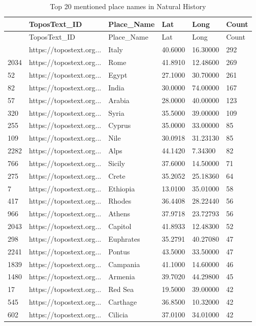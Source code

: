 \documentclass[
  12pt,
]{article}
\begin{document}
\hypertarget{tbl-topplace}{}
\begin{longtable}[]{@{}llllll@{}}
\caption{\label{tbl-topplace}Top 20 mentioned place names in Natural
History}\tabularnewline
\toprule\noalign{}
& ToposText\_ID & Place\_Name & Lat & Long & Count \\
\midrule\noalign{}
\endfirsthead
\toprule\noalign{}
& ToposText\_ID & Place\_Name & Lat & Long & Count \\
\midrule\noalign{}
\endhead
\bottomrule\noalign{}
\endlastfoot
1687 & https://topostext.org... & Italy & 40.6000 & 16.30000 & 292 \\
2034 & https://topostext.org... & Rome & 41.8910 & 12.48600 & 269 \\
52 & https://topostext.org... & Egypt & 27.1000 & 30.70000 & 261 \\
82 & https://topostext.org... & India & 30.0000 & 74.00000 & 167 \\
57 & https://topostext.org... & Arabia & 28.0000 & 40.00000 & 123 \\
320 & https://topostext.org... & Syria & 35.5000 & 39.00000 & 109 \\
255 & https://topostext.org... & Cyprus & 35.0000 & 33.00000 & 85 \\
109 & https://topostext.org... & Nile & 30.0918 & 31.23130 & 85 \\
2282 & https://topostext.org... & Alps & 44.1420 & 7.34300 & 82 \\
766 & https://topostext.org... & Sicily & 37.6000 & 14.50000 & 71 \\
275 & https://topostext.org... & Crete & 35.2052 & 25.18360 & 64 \\
7 & https://topostext.org... & Ethiopia & 13.0100 & 35.01000 & 58 \\
417 & https://topostext.org... & Rhodes & 36.4408 & 28.22440 & 56 \\
966 & https://topostext.org... & Athens & 37.9718 & 23.72793 & 56 \\
2043 & https://topostext.org... & Capitol & 41.8933 & 12.48300 & 52 \\
298 & https://topostext.org... & Euphrates & 35.2791 & 40.27080 & 47 \\
2241 & https://topostext.org... & Pontus & 43.5000 & 33.50000 & 47 \\
1839 & https://topostext.org... & Campania & 41.1000 & 14.60000 & 46 \\
1480 & https://topostext.org... & Armenia & 39.7020 & 44.29800 & 45 \\
17 & https://topostext.org... & Red Sea & 19.5000 & 39.00000 & 42 \\
545 & https://topostext.org... & Carthage & 36.8500 & 10.32000 & 42 \\
602 & https://topostext.org... & Cilicia & 37.0100 & 34.01000 & 42 \\
\end{longtable}
\end{document}
